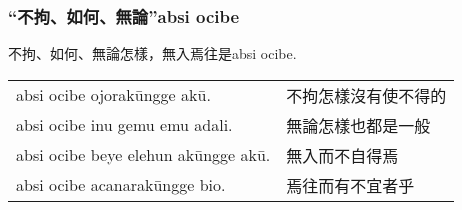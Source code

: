\documentclass{article}
\begin{document}
\subsubsection{“不拘、如何、無論”absi ocibe}
\noindent 不拘、如何、無論怎樣，無入焉往是absi ocibe.
\begin{center}
    \begin{tabularx}{\textwidth}{XX}
        absi ocibe ojorak\={u}ngge ak\={u}. & 不拘怎樣沒有使不得的\\
        absi ocibe inu gemu emu adali. & 無論怎樣也都是一般\\
        absi ocibe beye elehun ak\={u}ngge ak\={u}. & 無入而不自得焉\\
        absi ocibe acanarak\={u}ngge bio. & 焉往而有不宜者乎
    \end{tabularx}
\end{center}
\end{document}
